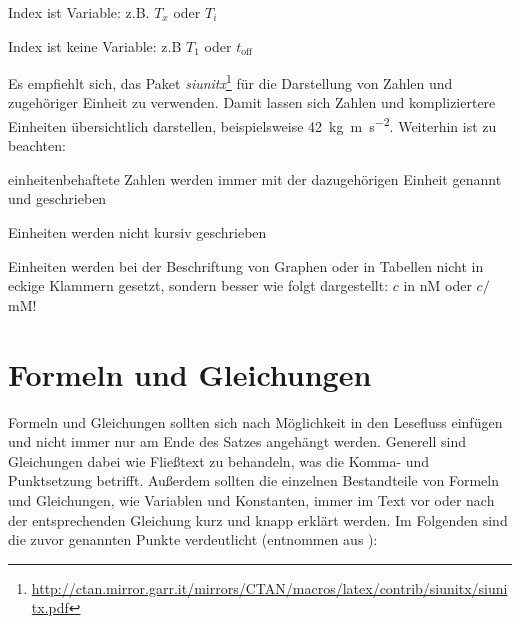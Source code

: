 \begin{compactitem}
	\item Index ist Variable: z.B. $T_x$ oder $T_i$
	\item Index ist keine Variable: z.B $T_{\textrm{1}}$ oder $t_{\textrm{off}}$
\end{compactitem}

Es empfiehlt sich, das Paket \textit{siunitx}\footnote{\url{http://ctan.mirror.garr.it/mirrors/CTAN/macros/latex/contrib/siunitx/siunitx.pdf}} für die Darstellung von Zahlen und zugehöriger Einheit zu verwenden. Damit lassen sich Zahlen und kompliziertere Einheiten übersichtlich darstellen, beispielsweise \SI{42}{\kilo\gram\metre\per\square\second}. Weiterhin ist zu beachten:

\begin{compactitem}
	\item einheitenbehaftete Zahlen werden immer mit der dazugehörigen Einheit genannt und geschrieben
	\item Einheiten werden nicht kursiv geschrieben
	\item Einheiten werden bei der Beschriftung von Graphen oder in Tabellen nicht in eckige Klammern gesetzt, sondern besser wie folgt dargestellt: $c$ in nM oder $c /$mM!
\end{compactitem}

\section{Formeln und Gleichungen}

Formeln und Gleichungen sollten sich nach Möglichkeit in den Lesefluss einfügen und nicht immer nur am Ende des Satzes angehängt werden. Generell sind Gleichungen dabei wie Fließtext zu behandeln, was die Komma- und Punktsetzung betrifft. Außerdem sollten die einzelnen Bestandteile von Formeln und Gleichungen, wie Variablen und Konstanten, immer im Text vor oder nach der entsprechenden Gleichung kurz und knapp erklärt werden. Im Folgenden sind die zuvor genannten Punkte verdeutlicht (entnommen aus \cite{MA_Kappel}):


